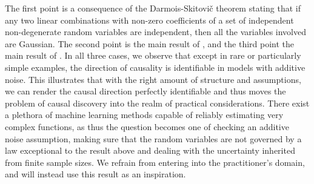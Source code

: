 \documentclass[11pt, a4paper]{memoir}
\theoremstyle{break}
\theoremstyle{break}
\theoremstyle{nonumberplain}
\begin{document}
The first point is a consequence of the Darmois-Skitovič theorem stating that if any two linear combinations with non-zero coefficients of a set of independent non-degenerate random variables are independent, then all the variables involved are Gaussian. The second point is the main result of \cite{ANM1}, and the third point the main result of \cite{ANM2}. In all three cases, we observe that except in rare or particularly simple examples, the direction of causality is identifiable in models with additive noise. This illustrates that with the right amount of structure and assumptions, we can render the causal direction perfectly identifiable and thus moves the problem of causal discovery into the realm of practical considerations. There exist a plethora of machine learning methods capable of reliably estimating very complex functions, as thus the question becomes one of checking an additive noise assumption, making sure that the random variables are not governed by a law exceptional to the result above and dealing with the uncertainty inherited from finite sample sizes. We refrain from entering into the practitioner's domain, and will instead use this result as an inspiration.
\end{document}
